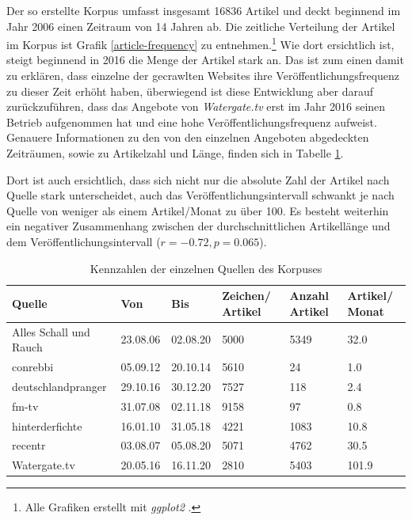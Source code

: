 Der so erstellte Korpus umfasst insgesamt 16836 Artikel und deckt beginnend im Jahr 2006 einen Zeitraum von 14 Jahren ab.
Die zeitliche Verteilung der Artikel im Korpus ist Grafik \ref{article-frequency}
zu entnehmen.\footnote{Alle Grafiken erstellt mit \textit{ggplot2} \parencite{ggplot2}.}
Wie dort ersichtlich ist, steigt beginnend in 2016 die Menge der Artikel stark an.
Das ist zum einen damit zu erklären, dass einzelne der gecrawlten Websites ihre Veröffentlichungsfrequenz zu dieser Zeit erhöht haben, überwiegend ist diese Entwicklung aber darauf zurückzuführen, dass das Angebote von \textit{Watergate.tv} erst im Jahr 2016 seinen Betrieb aufgenommen hat und eine hohe Veröffentlichungsfrequenz aufweist.
Genauere Informationen zu den von den einzelnen Angeboten abgedeckten Zeiträumen, sowie zu Artikelzahl und Länge, finden sich in Tabelle \ref{corpus-stats}.

Dort ist auch ersichtlich, dass sich nicht nur die absolute Zahl der Artikel nach Quelle stark unterscheidet, auch das Veröffentlichungsintervall schwankt je nach Quelle von weniger als einem Artikel/Monat zu über 100.
Es besteht weiterhin ein negativer Zusammenhang zwischen der durchschnittlichen Artikellänge und dem Veröffentlichungsintervall ($r = -0.72, p = 0.065$).

\begin{table}
    \begin{center}
        \begin{tabularx}{\textwidth}{lXXXXX}
            \toprule
            Quelle & Von & Bis & Zeichen/ Artikel & Anzahl Artikel & Artikel/ Monat\\
            \midrule
            Alles Schall und Rauch & 23.08.06 & 02.08.20 & 5000 & 5349 & 32.0\\
            conrebbi & 05.09.12 & 20.10.14 & 5610 & 24 & 1.0\\
            deutschlandpranger & 29.10.16 & 30.12.20 & 7527 & 118 & 2.4\\
            fm-tv & 31.07.08 & 02.11.18 & 9158 & 97 & 0.8\\
            hinterderfichte & 16.01.10 & 31.05.18 & 4221 & 1083 & 10.8\\
            recentr & 03.08.07 & 05.08.20 & 5071 & 4762 & 30.5\\
            Watergate.tv & 20.05.16 & 16.11.20 & 2810 & 5403 & 101.9\\
            \bottomrule
            \end{tabularx}
        \caption{Kennzahlen der einzelnen Quellen des Korpuses}
        \label{corpus-stats}
    \end{center}
\end{table}



